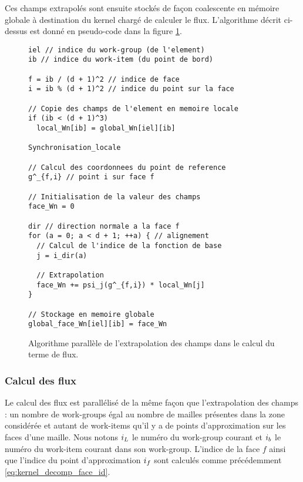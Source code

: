 Ces champs extrapolés sont ensuite stockés de façon coalescente
en mémoire globale à destination du kernel chargé de calculer le flux.
L’algorithme décrit ci-dessus est donné en pseudo-code dans la figure
\ref{img:kernel_surface_extract}.



\begin{figure}[!h]
	\begin{center}
		\caption{
			\label{img:kernel_surface_extract}
			Algorithme parallèle de l'extrapolation des champs
			dans le calcul du terme de flux.
		}
		
		\begin{lstlisting}
iel // indice du work-group (de l'element)
ib // indice du work-item (du point de bord)

f = ib / (d + 1)^2 // indice de face
i = ib % (d + 1)^2 // indice du point sur la face

// Copie des champs de l'element en memoire locale
if (ib < (d + 1)^3)
  local_Wn[ib] = global_Wn[iel][ib]

Synchronisation_locale

// Calcul des coordonnees du point de reference
g^_{f,i} // point i sur face f

// Initialisation de la valeur des champs
face_Wn = 0

dir // direction normale a la face f
for (a = 0; a < d + 1; ++a) { // alignement
  // Calcul de l'indice de la fonction de base
  j = i_dir(a)

  // Extrapolation
  face_Wn += psi_j(g^_{f,i}) * local_Wn[j]
}

// Stockage en memoire globale
global_face_Wn[iel][ib] = face_Wn
		\end{lstlisting}
	\end{center}
\end{figure}


\subsubsection{Calcul des flux}
\label{sssect:kernel_surface_flux}

Le calcul des flux est parallélisé de la même façon que l'extrapolation
des champs : un nombre de work-groups égal au nombre de mailles
présentes dans la zone considérée et autant de
work-items qu'il y a de points d'approximation sur les faces d'une maille.
Nous notons $i_{L}$ le numéro du
work-group courant et $i_b$ le numéro du work-item courant dans son work-group. L'indice de la face $f$ ainsi que l'indice du point
d'approximation $i_f$ sont calculés comme précédemment
\eqref{eq:kernel_decomp_face_id}.


